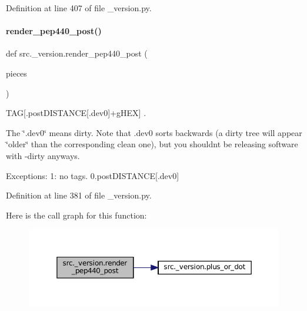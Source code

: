 Definition at line 407 of file \+\_\+version.\+py.

\mbox{\label{namespacesrc_1_1__version_a2553edd494b07cc780e662bbb2467b66}} 
\paragraph{\texorpdfstring{render\+\_\+pep440\+\_\+post()}{render\_pep440\_post()}}
{\footnotesize\ttfamily def src.\+\_\+version.\+render\+\_\+pep440\+\_\+post (\begin{DoxyParamCaption}\item[{}]{pieces }\end{DoxyParamCaption})}



T\+AG\mbox{[}.post\+D\+I\+S\+T\+A\+N\+CE\mbox{[}.dev0\mbox{]}+g\+H\+EX\mbox{]} . 

The \char`\"{}.\+dev0\char`\"{} means dirty. Note that .dev0 sorts backwards (a dirty tree will appear \char`\"{}older\char`\"{} than the corresponding clean one), but you shouldn\textquotesingle{}t be releasing software with -\/dirty anyways.

Exceptions\+: 1\+: no tags. 0.\+post\+D\+I\+S\+T\+A\+N\+CE\mbox{[}.dev0\mbox{]} 

Definition at line 381 of file \+\_\+version.\+py.

Here is the call graph for this function\+:
\nopagebreak
\begin{figure}[H]
\begin{center}
\leavevmode
\includegraphics[width=350pt]{namespacesrc_1_1__version_a2553edd494b07cc780e662bbb2467b66_cgraph}
\end{center}
\end{figure}
\mbox{\label{namespacesrc_1_1__version_a966d7d904289700bc6bbc20d64bd5c6e}} 
